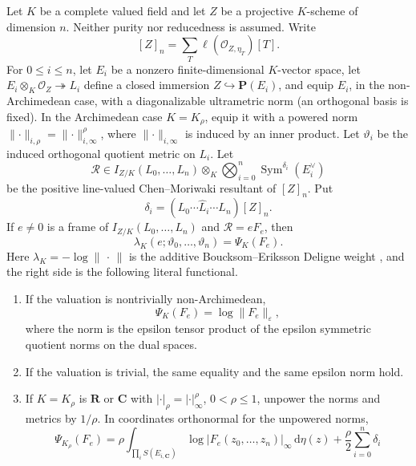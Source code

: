 \begin{lemma}
\label{lem:p171-module-c-field-comparison}
Let \(K\) be a complete valued field and let \(Z\) be a projective
\(K\)-scheme of dimension \(n\).  Neither purity nor reducedness is
assumed.  Write
\[
 [Z]_n=\sum_T\ell(\mathcal O_{Z,\eta_T})[T].
\]
For \(0\leq i\leq n\), let \(E_i\) be a nonzero finite-dimensional
\(K\)-vector space, let \(E_i\otimes_K\mathcal O_Z\twoheadrightarrow L_i\)
define a closed immersion \(Z\hookrightarrow\mathbf P(E_i)\), and equip
\(E_i\), in the non-Archimedean case, with a diagonalizable ultrametric norm
(an orthogonal basis is fixed).  In the Archimedean case
\(K=K_\rho\), equip it with a powered norm
\(\lVert\cdot\rVert_{i,\rho}=\lVert\cdot\rVert_{i,\infty}^{\rho}\), where
\(\lVert\cdot\rVert_{i,\infty}\) is induced by an inner product.  Let
\(\vartheta_i\) be the induced orthogonal quotient metric on \(L_i\).  Let
\[
 \mathcal R\in I_{Z/K}(L_0,\ldots,L_n)\otimes_K
 \bigotimes_{i=0}^n\operatorname{Sym}^{\delta_i}(E_i^\vee)
\]
be the positive line-valued Chen--Moriwaki resultant
\cite[Definition~1.6.3]{ChenMoriwaki21AdelicIntersection} of \([Z]_n\).  Put
\[
 \delta_i=(L_0\cdots\widehat L_i\cdots L_n)[Z]_n.
\]
If \(e\ne0\) is a frame of \(I_{Z/K}(L_0,\ldots,L_n)\) and
\(\mathcal R=eF_e\), then
\begin{equation}
 \lambda_K(e;\vartheta_0,\ldots,\vartheta_n)=\Psi_K(F_e).
 \label{eq:p171-module-c-field-identity}
\end{equation}
Here \(\lambda_K=-\log\lVert\,\cdot\,\rVert\) is the additive
Boucksom--Eriksson Deligne weight \cite[Section~8.3]{BE21}, and the right
side is the following literal functional.
\begin{enumerate}
\item If the valuation is nontrivially non-Archimedean,
\[
 \Psi_K(F_e)=\log\lVert F_e\rVert_\varepsilon,
\]
where the norm is the epsilon tensor product of the epsilon symmetric
quotient norms on the dual spaces.
\item If the valuation is trivial, the same equality and the same epsilon
norm hold.
\item If \(K=K_\rho\) is \(\mathbf R\) or \(\mathbf C\) with
\(\lvert\cdot\rvert_\rho=\lvert\cdot\rvert_\infty^\rho\),
\(0<\rho\leq1\), unpower the norms and metrics by \(1/\rho\).  In
coordinates orthonormal for the unpowered norms,
\begin{equation}
 \Psi_{K_\rho}(F_e)
 =\rho\int_{\prod_iS(E_{i,\mathbf C})}
       \log\lvert F_e(z_0,\ldots,z_n)\rvert_\infty\,
       \mathrm d\eta(z)
 +\frac\rho2\sum_{i=0}^n\delta_i

\end{equation}
\end{enumerate}
\end{lemma}
